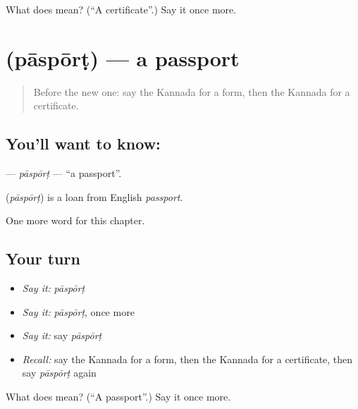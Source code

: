 \begin{tcolorbox}[breakable,colback=teal!4,colframe=teal!35!black,title={Before you move on}]
What does  mean? (\textquotedblleft{}A certificate\textquotedblright{}.) Say it once more.
\end{tcolorbox}
\section[\texorpdfstring{\kn{ಪಾಸ್ಪೋರ್ಟ್} (pāspōrṭ)}{ಪಾಸ್ಪೋರ್ಟ್ (pāspōrṭ)}]{ (pāspōrṭ) — a passport}

\label{lesson:KA-C223-pasport}



\begin{quote}
Before the new one: say the Kannada for a form, then the Kannada for a certificate.
\end{quote}

\subsection*{You'll want to know: }
\textbf{} — \emph{pāspōrṭ} — \textquotedblleft{}a passport\textquotedblright{}.

\begin{cousinweb}
\textbf{} (\emph{pāspōrṭ}) is a loan from English \emph{passport}.
\end{cousinweb}

\begin{grammarlens}[title={What you've built}]
One more word for this chapter.
\end{grammarlens}

\subsection*{Your turn}
\begin{itemize}
\raggedright
  \item \emph{Say it:} \emph{pāspōrṭ}
  \item \emph{Say it:} \emph{pāspōrṭ}, once more
  \item \emph{Say it:} say \emph{pāspōrṭ}
  \item \emph{Recall:} say the Kannada for a form, then the Kannada for a certificate, then say \emph{pāspōrṭ} again
\end{itemize}

\begin{tcolorbox}[breakable,colback=teal!4,colframe=teal!35!black,title={Before you move on}]
What does  mean? (\textquotedblleft{}A passport\textquotedblright{}.) Say it once more.
\end{tcolorbox}
